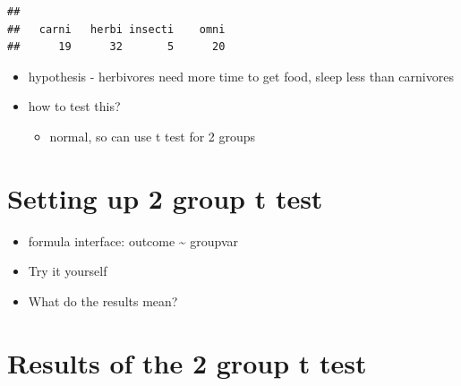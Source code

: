 \documentclass[
]{book}
\newenvironment{Shaded}{\begin{snugshade}}{\end{snugshade}}
\newcommand{\DataTypeTok}[1]{\textcolor[rgb]{0.13,0.29,0.53}{#1}}
\newcommand{\KeywordTok}[1]{\textcolor[rgb]{0.13,0.29,0.53}{\textbf{#1}}}
\newcommand{\NormalTok}[1]{#1}
\newcommand{\OperatorTok}[1]{\textcolor[rgb]{0.81,0.36,0.00}{\textbf{#1}}}
\newcommand{\StringTok}[1]{\textcolor[rgb]{0.31,0.60,0.02}{#1}}
\providecommand{\tightlist}{%
  \setlength{\itemsep}{0pt}\setlength{\parskip}{0pt}}
\begin{document}
\begin{verbatim}
## 
##   carni   herbi insecti    omni 
##      19      32       5      20
\end{verbatim}

\begin{itemize}
\tightlist
\item
  hypothesis - herbivores need more time to get food, sleep less than carnivores
\item
  how to test this?

  \begin{itemize}
  \tightlist
  \item
    normal, so can use t test for 2 groups
  \end{itemize}
\end{itemize}

\hypertarget{setting-up-2-group-t-test-1}{%
\section{Setting up 2 group t test}\label{setting-up-2-group-t-test-1}}

\begin{itemize}
\tightlist
\item
  formula interface: outcome \textasciitilde{} groupvar
\end{itemize}

\begin{Shaded}
\end{Shaded}

\begin{itemize}
\tightlist
\item
  Try it yourself
\item
  What do the results mean?
\end{itemize}

\hypertarget{results-of-the-2-group-t-test-1}{%
\section{Results of the 2 group t test}\label{results-of-the-2-group-t-test-1}}
\end{document}
